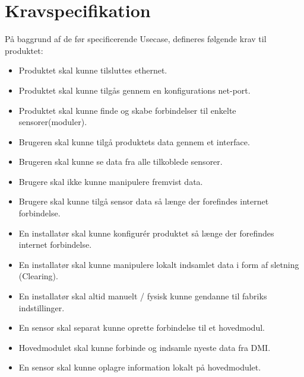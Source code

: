 \section{Kravspecifikation}
På baggrund af de før specificerende Usecase, defineres følgende krav til produktet:
\begin{itemize}
    \item Produktet skal kunne tilsluttes ethernet.
    \item Produktet skal kunne tilgås gennem en konfigurations net-port.
    \item Produktet skal kunne finde og skabe forbindelser til enkelte sensorer(moduler).
    \\
    \item Brugeren skal kunne tilgå produktets data gennem et interface.
    \item Brugeren skal kunne se data fra alle tilkoblede sensorer.
    \item Brugere skal ikke kunne manipulere fremvist data.
    \item Brugere skal kunne tilgå sensor data så længe der forefindes internet forbindelse.
    \\
    \item En installatør skal kunne konfigurér produktet så længe der forefindes internet forbindelse.
    \item En installatør skal kunne manipulere lokalt indsamlet data i form af sletning (Clearing).
    \item En installatør skal altid manuelt / fysisk kunne gendanne til fabriks indstillinger.
    \\
    \item En sensor skal separat kunne oprette forbindelse til et hovedmodul.
    \item Hovedmodulet skal kunne forbinde og indsamle nyeste data fra DMI.
    \item En sensor skal kunne oplagre information lokalt på hovedmodulet.
\end{itemize}

